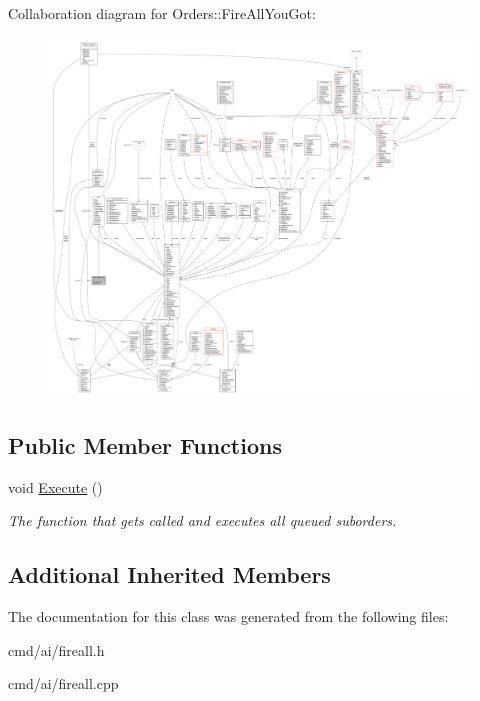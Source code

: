 Collaboration diagram for Orders\+:\+:Fire\+All\+You\+Got\+:
\nopagebreak
\begin{figure}[H]
\begin{center}
\leavevmode
\includegraphics[width=350pt]{d2/d9d/classOrders_1_1FireAllYouGot__coll__graph}
\end{center}
\end{figure}
\subsection*{Public Member Functions}
\begin{DoxyCompactItemize}
\item 
void \hyperlink{classOrders_1_1FireAllYouGot_a1b10c76ea77b80de3e59aa86e2560b59}{Execute} ()\hypertarget{classOrders_1_1FireAllYouGot_a1b10c76ea77b80de3e59aa86e2560b59}{}\label{classOrders_1_1FireAllYouGot_a1b10c76ea77b80de3e59aa86e2560b59}

\begin{DoxyCompactList}\small\item\em The function that gets called and executes all queued suborders. \end{DoxyCompactList}\end{DoxyCompactItemize}
\subsection*{Additional Inherited Members}


The documentation for this class was generated from the following files\+:\begin{DoxyCompactItemize}
\item 
cmd/ai/fireall.\+h\item 
cmd/ai/fireall.\+cpp\end{DoxyCompactItemize}
